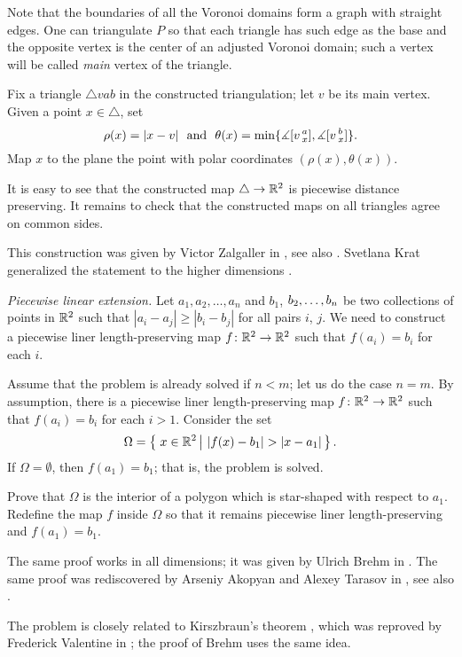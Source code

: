 Note that the boundaries of all the Voronoi domains form a graph with straight edges.
One can triangulate $P$ so that each triangle has such edge as the base 
and the opposite vertex is the center of an adjusted Voronoi domain; such a vertex will be called \emph{main} vertex of the triangle.

Fix a triangle $\triangle vab$ in the constructed triangulation; 
let $v$ be its main vertex.
Given a point 
$x\in  \triangle$, set 
\[\rho(x)=|x-v|\ \ \text{and}\ \  \theta(x)=\min \{\measuredangle \hinge vax,\measuredangle\hinge vbx\}.\]
Map $x$ to the plane the point with polar coordinates $(\rho(x),\theta(x))$.

It is easy to see that the constructed map $\triangle\to\mathbb{R}^2$ is piecewise distance preserving.
It remains to check that the constructed maps on all triangles agree on common sides.


This construction was given by Victor Zalgaller in \cite{zalgaller-polyhedra}, 
see also \cite{petrunin-yashinsky}.
Svetlana Krat generalized the statement to the higher dimensions \cite[see][]{krat}.



\textit{Piecewise linear extension.}
Let $a_1,a_2,\dots,a_n$
and $b_1$, $b_2,\z\dots,b_n$
be two collections of points in $\mathbb{R}^2$
such that $|a_i-a_j|\ge |b_i-b_j|$ for all pairs $i$, $j$.
We need to construct a piecewise liner length-preserving map $f\colon\mathbb{R}^2\to\mathbb{R}^2$
such that $f(a_i)=b_i$ for each $i$.

Assume that the problem is already solved if $n<m$;
let us do the case $n=m$.
By assumption, 
there is a piecewise liner length-preserving map $f\colon\mathbb{R}^2\to\mathbb{R}^2$
such that $f(a_i)=b_i$ for each $i>1$.
Consider the set 
\[\Omega=\set{x\in\RR^2}{|f(x)-b_1|>|x-a_1|}.\]
If $\Omega=\emptyset$,
then $f(a_1)=b_1$; 
that is, the problem is solved.

Prove that $\Omega$ is the interior of a polygon
which is star-shaped with respect to $a_1$.
Redefine the map $f$ inside $\Omega$ so that it remains piecewise liner length-preserving and $f(a_1)=b_1$.

The same proof works in all dimensions;
it was given by Ulrich Brehm in \cite{brehm}.
The same proof was rediscovered by Arseniy Akopyan and Alexey Tarasov in \cite{akopyan-tarasov},
see also \cite{petrunin-yashinsky}.

The problem is closely related to Kirszbraun's theorem \cite{kirszbraun},
which was reproved by Frederick Valentine in \cite{valentine};
the proof of Brehm uses the same idea.



